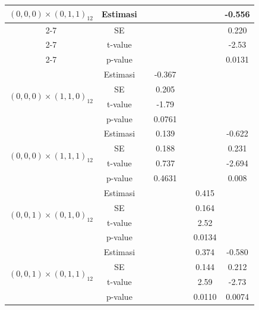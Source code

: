 \begin{enumerate}[label=\alph*.]
\begin{longtable}{|c|c|c|c|c|c|c|}
            \multirow{4}{*}{$(0,0,0)\times(0,1,1)_{12}$}
            & Estimasi &  &  &  &  & -0.556 \\ \cline{2-7}
            & SE       &  &  &  &  & 0.220  \\ \cline{2-7}
            & t-value  &  &  &  &  & -2.53 \\ \cline{2-7}
            & p-value  &  &  &  &  & 0.0131 \\ \hline

            \multirow{4}{*}{$(0,0,0)\times(1,1,0)_{12}$}
            & Estimasi &  & -0.367 &  &  &  \\ \cline{2-7}
            & SE       &  & 0.205  &  &  &  \\ \cline{2-7}
            & t-value  &  & -1.79  &  &  &  \\ \cline{2-7}
            & p-value  &  & 0.0761 &  &  &  \\ \hline

            \multirow{4}{*}{$(0,0,0)\times(1,1,1)_{12}$}
            & Estimasi &  & 0.139 &  &  & -0.622 \\ \cline{2-7}
            & SE       &  & 0.188 &  &  & 0.231  \\ \cline{2-7}
            & t-value  &  & 0.737 &  &  & -2.694 \\ \cline{2-7}
            & p-value  &  & 0.4631 &  &  & 0.008  \\ \hline

            \multirow{4}{*}{$(0,0,1)\times(0,1,0)_{12}$}
            & Estimasi &  &  &  & 0.415 &  \\ \cline{2-7}
            & SE       &  &  &  & 0.164 &  \\ \cline{2-7}
            & t-value  &  &  &  & 2.52  &  \\ \cline{2-7}
            & p-value  &  &  &  & 0.0134 &  \\ \hline

            \multirow{4}{*}{$(0,0,1)\times(0,1,1)_{12}$}
            & Estimasi &  &  &  & 0.374 & -0.580 \\ \cline{2-7}
            & SE       &  &  &  & 0.144 & 0.212  \\ \cline{2-7}
            & t-value  &  &  &  & 2.59  & -2.73 \\ \cline{2-7}
            & p-value  &  &  &  & 0.0110 & 0.0074 \\ \hline


\end{longtable}
\end{enumerate}
